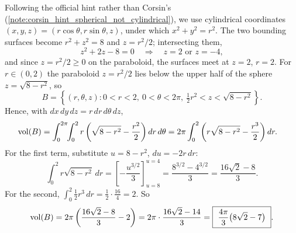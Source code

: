 \begin{exercisesolution}
\label{sol:paraboloid_hypersurface_volume}
Following the official hint rather than Corsin's
(\cref{note:corsin_hint_spherical_not_cylindrical}), we use
cylindrical coordinates $(x,y,z) = (r\cos\theta,r\sin\theta,z)$, under which $x^2+y^2=r^2$.
The two bounding surfaces become $r^2+z^2=8$ and $z = r^2/2$; intersecting them,
\[z^2+2z-8 = 0 \quad\Longrightarrow\quad z = 2 \text{ or } z=-4,\]
and since $z=r^2/2\geq0$ on the paraboloid, the surfaces meet at $z=2$, $r=2$. For
$r \in (0,2)$ the paraboloid $z=r^2/2$ lies below the upper half of the sphere
$z=\sqrt{8-r^2}$, so
\[B = \left\{(r,\theta,z) : 0<r<2,\ 0<\theta<2\pi,\ \tfrac12r^2 < z < \sqrt{8-r^2}\right\}.\]
Hence, with $dx\,dy\,dz = r\,dr\,d\theta\,dz$,
\[
\begin{aligned}
\operatorname{vol}(B) &= \int_0^{2\pi}\!\!\int_0^2 r\left(\sqrt{8-r^2} - \frac{r^2}{2}\right)dr\,d\theta
  = 2\pi\int_0^2 \left(r\sqrt{8-r^2} - \frac{r^3}{2}\right)dr.
\end{aligned}
\]
For the first term, substitute $u = 8-r^2$, $du=-2r\,dr$:
\[\int_0^2 r\sqrt{8-r^2}\,dr = \left[-\frac{u^{3/2}}{3}\right]_{u=8}^{u=4}
  = \frac{8^{3/2}-4^{3/2}}{3} = \frac{16\sqrt2-8}{3}.\]
For the second, $\int_0^2 \tfrac12 r^3\,dr = \tfrac12\cdot\tfrac{16}{4} = 2$. So
\[\operatorname{vol}(B) = 2\pi\left(\frac{16\sqrt2-8}{3} - 2\right) = 2\pi\cdot\frac{16\sqrt2-14}{3}
  = \boxed{\ \frac{4\pi}{3}\big(8\sqrt2-7\big)\ }.\]
\end{exercisesolution}

